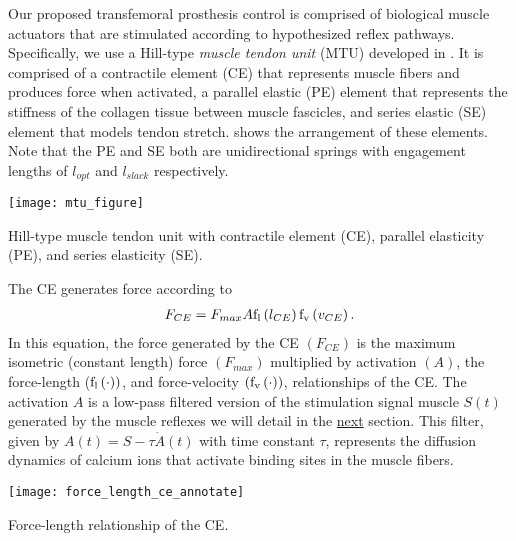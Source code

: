 Our proposed transfemoral prosthesis control is comprised of biological muscle
actuators that are stimulated according to hypothesized reflex pathways.
Specifically, we use a Hill-type \emph{muscle tendon unit} (MTU) developed in
\citet{geyer2010muscle} . It is comprised of a contractile element (CE) that
represents muscle fibers and produces force when activated, a parallel elastic
(PE) element that represents the stiffness of the collagen tissue between muscle
fascicles, and series elastic (SE) element that models tendon stretch.
 shows the arrangement of these elements. Note that the
PE and SE both are unidirectional springs with engagement lengths of $l_{opt}$
and $l_{slack}$ respectively.
\begin{marginfigure}[-1in]
    \centering
    \texttt{[image: mtu\_figure]}
    \vspace{-0.4in}
    \caption{Hill-type muscle tendon unit with contractile element (CE),
    parallel elasticity (PE), and series elasticity (SE).}
    \label{fig:hill_type_mtu}
\end{marginfigure}

The CE generates force according to
\begin{align}
    F_{CE} = F_{max} A \mathrm{f_l}\left( l_{CE} \right) \mathrm{f_v}\left( v_{CE} \right).
    \label{eq:hill_ce}
\end{align}
In this equation, the force generated by the CE $(F_{CE})$ is the maximum
isometric (constant length) force $(F_{max})$ multiplied by activation $(A)$,
the force-length ($\mathrm{f_l}\left( \cdot \right))$, and force-velocity
$(\mathrm{f_v}\left( \cdot \right))$, relationships of the CE. The activation $A$ is a low-pass
filtered version of the stimulation signal muscle $S(t)$ generated by the muscle
reflexes we will detail in the \hyperref[sec:neuro_stance_reflexes]{next}
section. This filter, given by $A(t) = S - \tau \dot A(t)$ with time constant
$\tau$, represents the diffusion dynamics of calcium ions that activate binding
sites in the muscle fibers.
\begin{marginfigure}[0.2in]
    \centering
    \texttt{[image: force\_length\_ce\_annotate]}
    \vspace{-0.25in}
    \caption{Force-length relationship of the CE.}
    \label{fig:force_length_ce}
\end{marginfigure}

